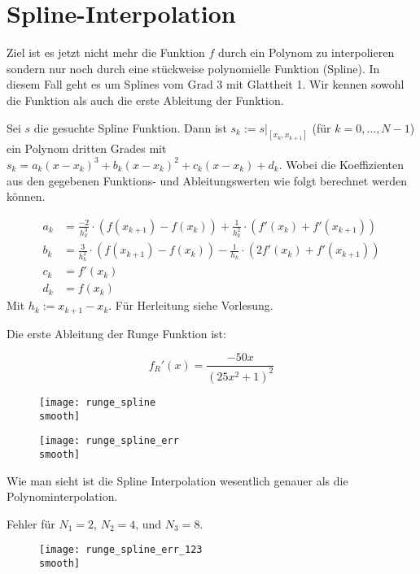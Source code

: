 \documentclass[]{scrartcl}
\begin{document}
	\section{Spline-Interpolation}
	
	Ziel ist es jetzt nicht mehr die Funktion $f$ durch ein Polynom zu interpolieren sondern nur noch durch eine stückweise polynomielle Funktion (Spline). In diesem Fall geht es um Splines vom Grad 3 mit Glattheit 1. Wir kennen sowohl die Funktion als auch die erste Ableitung der Funktion.
	
	Sei $s$ die gesuchte Spline Funktion. Dann ist $s_k:=s|_{[x_k,x_{k+1}]}$ (für $k=0,\dots,N-1$) ein Polynom dritten Grades mit $s_k=a_k(x-x_k)^3 + b_k(x-x_k)^2 + c_k(x-x_k) + d_k$. Wobei die Koeffizienten aus den gegebenen Funktions- und Ableitungswerten wie folgt berechnet werden können.
	
	\begin{align*}
		a_k&=\frac{-2}{h_k^3}\cdot(f(x_{k+1})-f(x_k)) + \frac{1}{h_k^2}\cdot(f'(x_k)+f'(x_{k+1}))\\
		b_k&=\frac{3}{h_k^2}\cdot(f(x_{k+1})-f(x_k)) - \frac{1}{h_k} \cdot(2f'(x_k)+f'(x_{k+1}))\\
		c_k&=f'(x_k)\\
		d_k&=f(x_k)
	\end{align*}
	Mit $h_k:=x_{k+1}-x_k$. Für Herleitung siehe Vorlesung.
	
	Die erste Ableitung der Runge Funktion ist:
	
	\[f_R'(x)=\frac{-50x}{(25x^2+1)^2}\]
	
	
	\begin{figure}[H]
		\centering
		\begin{minipage}{0.5\textwidth}
			\texttt{[image: runge\_spline\\smooth]}
			\caption{\label{Abb.5}}
		\end{minipage}
		\begin{minipage}{0.49\textwidth}
			\texttt{[image: runge\_spline\_err\\smooth]}
			\caption{\label{Abb.6}}
		\end{minipage}
	\end{figure}
	
	Wie man sieht ist die Spline Interpolation wesentlich genauer als die Polynominterpolation.
	
	\newpage
	
	Fehler für $N_1=2$, $N_2=4$, und $N_3=8$.
 	
 	\begin{figure}[H]
 		\centering
		\texttt{[image: runge\_spline\_err\_123\\smooth]}
		\caption{\label{Abb.9}}
 	\end{figure}
 	
\end{document}

